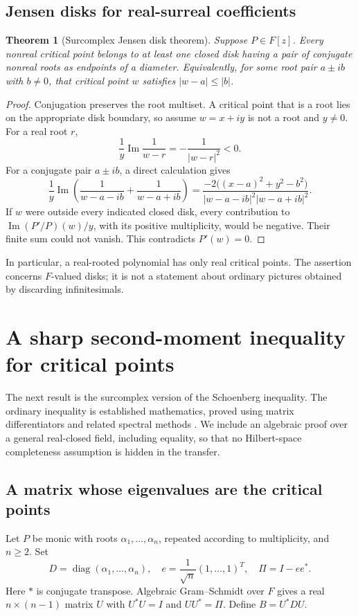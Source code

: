 \documentclass[11pt,letterpaper]{article}
\numberwithin{equation}{section}
\newtheorem{theorem}{Theorem}[section]
\theoremstyle{definition}
\theoremstyle{remark}\newtheorem{remark}[theorem]{Remark}
\begin{document}
\subsection{Jensen disks for real-surreal coefficients}
\begin{theorem}[Surcomplex Jensen disk theorem]\label{thm:jensen}
Suppose $P\in F[z]$. Every nonreal critical point belongs to at least
one closed disk having a pair of conjugate nonreal roots as endpoints
of a diameter. Equivalently, for some root pair $a\pm ib$ with $b\ne0$,
that critical point $w$ satisfies $|w-a|\le |b|$.
\end{theorem}
\begin{proof}
Conjugation preserves the root multiset. A critical point that is a root
lies on the appropriate disk boundary, so assume $w=x+iy$ is not a root
and $y\ne0$. For a real root $r$,
\[
 \frac1y\operatorname{Im}\frac1{w-r}=-\frac1{|w-r|^2}<0.
\]
For a conjugate pair $a\pm ib$, a direct calculation gives
\begin{equation}\label{eq:jensencalc}
 \frac1y\operatorname{Im}\left(\frac1{w-a-ib}+\frac1{w-a+ib}\right)
 =\frac{-2\bigl((x-a)^2+y^2-b^2\bigr)}
 {|w-a-ib|^2|w-a+ib|^2}.
\end{equation}
If $w$ were outside every indicated closed disk, every contribution to
$\operatorname{Im}(P'/P)(w)/y$, with its positive multiplicity, would be
negative. Their finite sum could not vanish. This contradicts $P'(w)=0$.
\end{proof}
In particular, a real-rooted polynomial has only real critical points.
The assertion concerns $F$-valued disks; it is not a statement about
ordinary pictures obtained by discarding infinitesimals.

\section{A sharp second-moment inequality for critical points}\label{sec:moment}
The next result is the surcomplex version of the Schoenberg inequality.
The ordinary inequality is established mathematics, proved using
matrix differentiators and related spectral methods
\cite{Pereira,KushelTyaglov}. We include an algebraic proof over a general
real-closed field, including equality, so that no Hilbert-space completeness
assumption is hidden in the transfer.

\subsection{A matrix whose eigenvalues are the critical points}
Let $P$ be monic with roots $\alpha_1,\ldots,\alpha_n$, repeated according
to multiplicity, and $n\ge2$. Set
\[
 D=\operatorname{diag}(\alpha_1,\ldots,\alpha_n),\quad
 e=\frac1{\sqrt n}(1,\ldots,1)^T,\quad \Pi=I-ee^*.
\]
Here $*$ is conjugate transpose. Algebraic Gram--Schmidt over $F$ gives
a real $n\times(n-1)$ matrix $U$ with $U^*U=I$ and $UU^*=\Pi$.
Define $B=U^*DU$.
\end{document}
